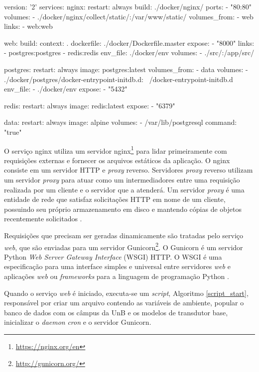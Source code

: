 \begin{python}[caption={Serviços providos pelo Docker Compose.}, captionpos=b, label={compose_docker}]
version: '2'
services:
  nginx:
    restart: always
    build: ./docker/nginx/
    ports:
      - "80:80"
    volumes:
      - ./docker/nginx/collect/static/:/var/www/static/
    volumes_from:
      - web
    links:
      - web:web

  web:
    build:
      context: .
      dockerfile: ./docker/Dockerfile.master
    expose:
      - "8000"
    links:
      - postgres:postgres
      - redis:redis
    env_file: ./docker/env
    volumes:
      - ./src/:/app/src/

  postgres:
    restart: always
    image: postgres:latest
    volumes_from:
      - data
    volumes:
      - ./docker/postgres/docker-entrypoint-initdb.d: \
         /docker-entrypoint-initdb.d
    env_file:
      - ./docker/env
    expose:
      - "5432"

  redis:
    restart: always
    image: redis:latest
    expose:
      - "6379"

  data:
    restart: always
    image: alpine
    volumes:
      - /var/lib/postgresql
    command: "true"
\end{python}

O serviço nginx utiliza um servidor nginx\footnote{\url{https://nginx.org/en}} para lidar primeiramente com requisições externas e fornecer os arquivos estáticos da aplicação. O nginx consiste em um servidor HTTP e \textit{proxy} reverso. Servidores \textit{proxy} reverso utilizam um servidor \textit{proxy} para atuar como um intermediadores entre uma requisição realizada por um cliente e o servidor que a atenderá. Um servidor \textit{proxy} é uma entidade de rede que satisfaz solicitações HTTP em nome de um cliente, possuindo seu próprio armazenamento em disco e mantendo cópias de objetos recentemente solicitados \cite{kurose_2002}.

Requisições que precisam ser geradas dinamicamente são tratadas pelo serviço \textit{web}, que são enviadas para um servidor Gunicorn\footnote{\url{http://gunicorn.org/}}. O Gunicorn é um servidor Python \textit{Web Server Gateway Interface} (WSGI) HTTP. O WSGI é uma especificação para uma interface simples e universal entre servidores \textit{web} e aplicações \textit{web} ou \textit{frameworks} para a linguagem de programação Python \cite{pep_333}.

Quando o serviço \textit{web} é iniciado, executa-se um \textit{script}, Algoritmo \ref{script_start}, responsável por criar um arquivo contendo as variáveis de ambiente, popular o banco de dados com os câmpus da UnB e os modelos de transdutor base, inicializar o \textit{daemon} \textit{cron} e o servidor Gunicorn.

